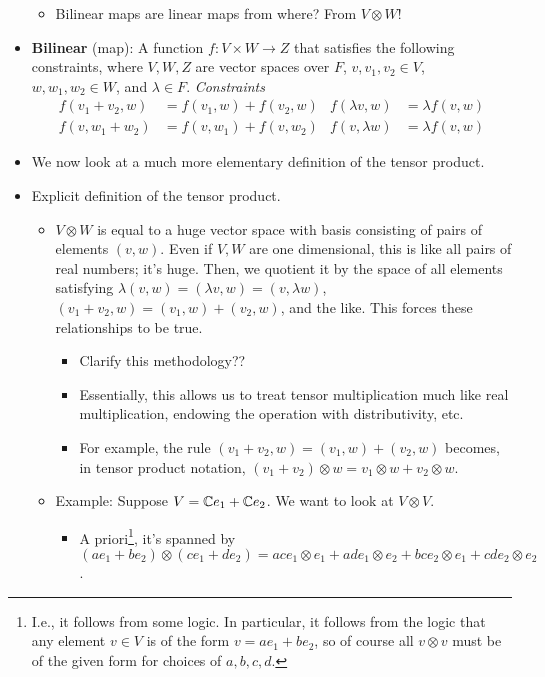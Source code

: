 \documentclass[../notes.tex]{subfiles}
\begin{document}
\begin{itemize}
\begin{itemize}
        \item Bilinear maps are linear maps from where? From $V\otimes W$!
    \end{itemize}
    \item \textbf{Bilinear} (map): A function $f:V\times W\to Z$ that satisfies the following constraints, where $V,W,Z$ are vector spaces over $F$, $v,v_1,v_2\in V$, $w,w_1,w_2\in W$, and $\lambda\in F$. \emph{Constraints}
    \begin{align*}
        f(v_1+v_2,w) &= f(v_1,w)+f(v_2,w)&
            f(\lambda v,w) &= \lambda f(v,w)\\
        f(v,w_1+w_2) &= f(v,w_1)+f(v,w_2)&
            f(v,\lambda w) &= \lambda f(v,w)
    \end{align*}
    \item We now look at a much more elementary definition of the tensor product.
    \item Explicit definition of the tensor product.
    \begin{itemize}
        \item $V\otimes W$ is equal to a huge vector space with basis consisting of pairs of elements $(v,w)$. Even if $V,W$ are one dimensional, this is like all pairs of real numbers; it's huge. Then, we quotient it by the space of all elements satisfying $\lambda(v,w)=(\lambda v,w)=(v,\lambda w)$, $(v_1+v_2,w)=(v_1,w)+(v_2,w)$, and the like. This forces these relationships to be true.
        \begin{itemize}
            \item Clarify this methodology??
            \item Essentially, this allows us to treat tensor multiplication much like real multiplication, endowing the operation with distributivity, etc.
            \item For example, the rule $(v_1+v_2,w)=(v_1,w)+(v_2,w)$ becomes, in tensor product notation, $(v_1+v_2)\otimes w=v_1\otimes w+v_2\otimes w$.
        \end{itemize}
        \item Example: Suppose $V=\mathbb{C} e_1+\mathbb{C} e_2$. We want to look at $V\otimes V$.
        \begin{itemize}
            \item A priori\footnote{I.e., it follows from some logic. In particular, it follows from the logic that any element $v\in V$ is of the form $v=ae_1+be_2$, so of course all $v\otimes v$ must be of the given form for choices of $a,b,c,d$.}, it's spanned by $(ae_1+be_2)\otimes(ce_1+de_2)=ace_1\otimes e_1+ade_1\otimes e_2+bce_2\otimes e_1+cde_2\otimes e_2$.

\end{itemize}
\end{itemize}
\end{itemize}
\end{document}
